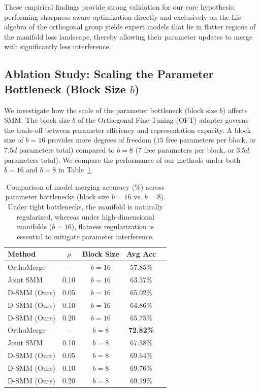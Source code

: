 \documentclass{article}
\theoremstyle{plain}
\theoremstyle{definition}
\theoremstyle{remark}
\begin{document}
These empirical findings provide strong validation for our core hypothesis: performing sharpness-aware optimization directly and exclusively on the Lie algebra of the orthogonal group yields expert models that lie in flatter regions of the manifold loss landscape, thereby allowing their parameter updates to merge with significantly less interference.

\subsection{Ablation Study: Scaling the Parameter Bottleneck (Block Size $b$)}
We investigate how the scale of the parameter bottleneck (block size $b$) affects SMM. The block size $b$ of the Orthogonal Fine-Tuning (OFT) adapter governs the trade-off between parameter efficiency and representation capacity. A block size of $b=16$ provides more degrees of freedom ($15$ free parameters per block, or $7.5d$ parameters total) compared to $b=8$ ($7$ free parameters per block, or $3.5d$ parameters total).
We compare the performance of our methods under both $b=16$ and $b=8$ in Table~\ref{tab:bottleneck}.

\begin{table}[t]
\caption{Comparison of model merging accuracy (\%) across parameter bottlenecks (block size $b=16$ vs. $b=8$). Under tight bottlenecks, the manifold is naturally regularized, whereas under high-dimensional manifolds ($b=16$), flatness regularization is essential to mitigate parameter interference.}
\label{tab:bottleneck}
\vskip 0.15in
\begin{center}
\begin{small}
\begin{sc}
\begin{tabular}{lcccc}
\toprule
Method & $\rho$ & Block Size & Avg Acc \\
\midrule
OrthoMerge & -- & $b=16$ & 57.85\% \\
Joint SMM & 0.10 & $b=16$ & 63.37\% \\
D-SMM (Ours) & 0.05 & $b=16$ & 65.02\% \\
D-SMM (Ours) & 0.10 & $b=16$ & 64.86\% \\
D-SMM (Ours) & 0.20 & $b=16$ & 65.75\% \\
\midrule
OrthoMerge & -- & $b=8$ & \bf 72.82\% \\
Joint SMM & 0.10 & $b=8$ & 67.38\% \\
D-SMM (Ours) & 0.05 & $b=8$ & 69.64\% \\
D-SMM (Ours) & 0.10 & $b=8$ & 69.76\% \\
D-SMM (Ours) & 0.20 & $b=8$ & 69.19\% \\
\bottomrule
\end{tabular}
\end{sc}
\end{small}
\end{center}
\vskip -0.1in
\end{table}
\end{document}
